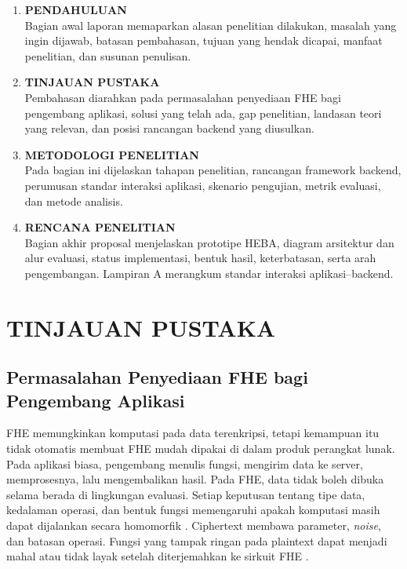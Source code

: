 \documentclass[12pt,a4paper,oneside]{report}
\begin{document}
\begin{enumerate}[label=\textbf{BAB \Roman* :}, leftmargin=2.6cm]
  \item \textbf{PENDAHULUAN}\\
  Bagian awal laporan memaparkan alasan penelitian dilakukan, masalah yang ingin dijawab, batasan pembahasan, tujuan yang hendak dicapai, manfaat penelitian, dan susunan penulisan.

  \item \textbf{TINJAUAN PUSTAKA}\\
  Pembahasan diarahkan pada permasalahan penyediaan FHE bagi pengembang aplikasi, solusi yang telah ada, gap penelitian, landasan teori yang relevan, dan posisi rancangan backend yang diusulkan.

  \item \textbf{METODOLOGI PENELITIAN}\\
  Pada bagian ini dijelaskan tahapan penelitian, rancangan framework backend, perumusan standar interaksi aplikasi, skenario pengujian, metrik evaluasi, dan metode analisis.

  \item \textbf{RENCANA PENELITIAN}\\
  Bagian akhir proposal menjelaskan prototipe HEBA, diagram arsitektur dan alur evaluasi, status implementasi, bentuk hasil, keterbatasan, serta arah pengembangan. Lampiran A merangkum standar interaksi aplikasi--backend.
\end{enumerate}

\chapter{TINJAUAN PUSTAKA}

\section{Permasalahan Penyediaan FHE bagi Pengembang Aplikasi}

FHE memungkinkan komputasi pada data terenkripsi, tetapi kemampuan itu tidak otomatis membuat FHE mudah dipakai di dalam produk perangkat lunak. Pada aplikasi biasa, pengembang menulis fungsi, mengirim data ke server, memprosesnya, lalu mengembalikan hasil. Pada FHE, data tidak boleh dibuka selama berada di lingkungan evaluasi. Setiap keputusan tentang tipe data, kedalaman operasi, dan bentuk fungsi memengaruhi apakah komputasi masih dapat dijalankan secara homomorfik \cite{vinko2026secureByDesign,wu2025ckksSurvey}. Ciphertext membawa parameter, \emph{noise}, dan batasan operasi. Fungsi yang tampak ringan pada plaintext dapat menjadi mahal atau tidak layak setelah diterjemahkan ke sirkuit FHE \cite{peker2025confidentialStatisticalFhe}.
\end{document}
